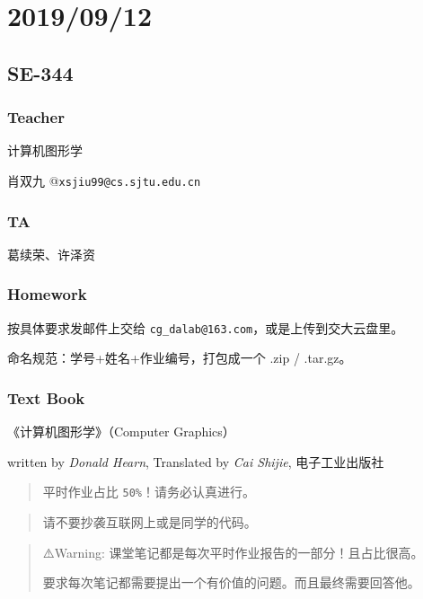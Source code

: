 \documentclass[
]{article}
\date{}
\begin{document}
\hypertarget{header-n0}{%
\section{2019/09/12}\label{header-n0}}

\hypertarget{header-n2}{%
\subsection{SE-344}\label{header-n2}}

\hypertarget{header-n3}{%
\subsubsection{Teacher}\label{header-n3}}

计算机图形学

肖双九 @\texttt{xsjiu99@cs.sjtu.edu.cn}

\hypertarget{header-n6}{%
\subsubsection{TA}\label{header-n6}}

葛续荣、许泽资

\hypertarget{header-n8}{%
\subsubsection{Homework}\label{header-n8}}

按具体要求发邮件上交给
\texttt{cg\_dalab@163.com}，或是上传到交大云盘里。

命名规范：学号+姓名+作业编号，打包成一个 .zip / .tar.gz。

\hypertarget{header-n11}{%
\subsubsection{Text Book}\label{header-n11}}

《计算机图形学》（Computer Graphics）

written by \emph{Donald Hearn}, Translated by \emph{Cai Shijie},
电子工业出版社

\begin{quote}
平时作业占比 \texttt{50\%}！请务必认真进行。
\end{quote}

\begin{quote}
请不要抄袭互联网上或是同学的代码。
\end{quote}

\begin{quote}
⚠️Warning: 课堂笔记都是每次平时作业报告的一部分！且占比很高。

要求每次笔记都需要提出一个有价值的问题。而且最终需要回答他。
\end{quote}
\end{document}
